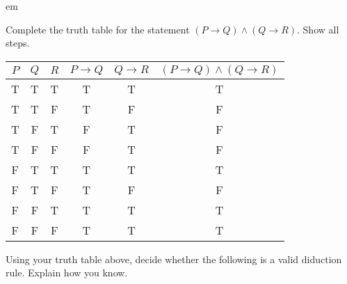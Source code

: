 \documentclass[12pt]{exam}
\def\imp{\rightarrow}
\begin{document}
  em

 \begin{questions}
   \question[8] Complete the truth table for the statement $(P \imp Q) \wedge (Q \imp R)$.  Show all steps.


       \begin{solution}
         \begin{center}
       \begin{tabular}{c|c|c||c | c|c}
         $P$ & $Q$ & $R$ & $P \imp Q$ & $Q \imp R$ & $(P \imp Q) \wedge (Q \imp R)$\\ \hline
         T & T & T & T & T & T\\
         T & T & F & T & F & F\\
         T & F & T & F & T & F \\
         T & F & F & F & T & F \\
         F & T & T & T & T & T \\
         F & T & F & T & F & F \\
         F & F & T & T & T & T \\
         F & F & F & T & T & T
       \end{tabular}
     \end{center}
     \end{solution}


   \question[2] Using your truth table above, decide whether the following is a valid diduction rule.  Explain how you know.


\end{questions}
\end{document}
